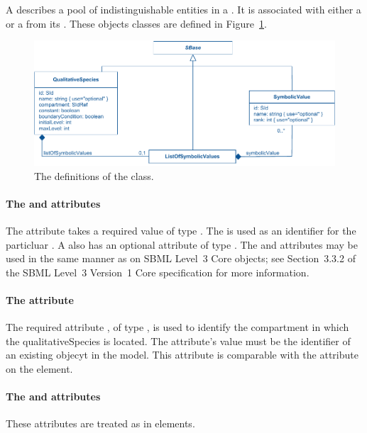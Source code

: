 A \QualitativeSpecies describes a pool of indistinguishable entities in a . It is associated with either a  or a  from its .  These objects classes are defined in Figure~\ref{qual-qualitative-species-uml}.

\begin{figure}
  \includegraphics{figs/qual-qualitative-species-uml.pdf}
  \caption{The definitions of the \QualitativeSpecies class. }
  \label{qual-qualitative-species-uml}
\end{figure}


\paragraph{The \fixttspace{} and \fixttspace{} attributes}

The  attribute takes a required value
of type . The  is used as an identifier for the particluar \QualitativeSpecies.  A \QualitativeSpecies also has an optional  attribute of type . 
 The  and  attributes may be used
in the same manner as on SBML Level~3 Core
objects; see Section~3.3.2 of the SBML Level~3 Version~1 Core
specification for more information.


\paragraph{The  attribute}
The required attribute , of type , is used to identify the compartment in which the qualitativeSpecies is located.  The attribute's value must be the identifier of an existing  objecyt in the model.  This attribute is comparable with the  attribute on the  element.

\paragraph{The  and  attributes}
These attributes are treated as in  elements.

